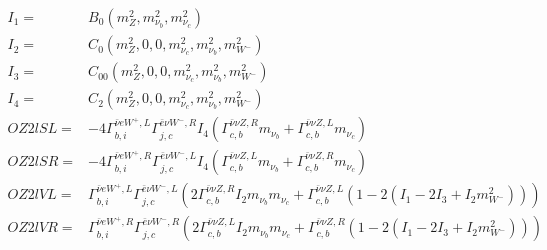 \documentclass[A4,landscape]{article}
\begin{document}
\begin{align} 
I_1= & B_0(m^2_{Z}, m^2_{\nu_{{b}}}, m^2_{\nu_{{c}}}) \\ 
I_2= & C_0(m^2_{Z}, 0, 0, m^2_{\nu_{{c}}}, m^2_{\nu_{{b}}}, m^2_{W^-}) \\ 
I_3= & C_{00}(m^2_{Z}, 0, 0, m^2_{\nu_{{c}}}, m^2_{\nu_{{b}}}, m^2_{W^-}) \\ 
I_4= & C_2(m^2_{Z}, 0, 0, m^2_{\nu_{{c}}}, m^2_{\nu_{{b}}}, m^2_{W^-}) \\ 
  OZ2lSL= & -4  \Gamma^{\bar{\nu}e W^+,L}_{b, i} \Gamma^{\bar{e}\nu W^- ,R}_{j, c} I_4 (\Gamma^{\bar{\nu}\nu Z ,R}_{c, b} m_{\nu_{{b}}} + \Gamma^{\bar{\nu}\nu Z ,L}_{c, b} m_{\nu_{{c}}}) \\ 
  OZ2lSR= & -4  \Gamma^{\bar{\nu}e W^+,R}_{b, i} \Gamma^{\bar{e}\nu W^- ,L}_{j, c} I_4 (\Gamma^{\bar{\nu}\nu Z ,L}_{c, b} m_{\nu_{{b}}} + \Gamma^{\bar{\nu}\nu Z ,R}_{c, b} m_{\nu_{{c}}}) \\ 
  OZ2lVL= &  \Gamma^{\bar{\nu}e W^+,L}_{b, i} \Gamma^{\bar{e}\nu W^- ,L}_{j, c} (2 \Gamma^{\bar{\nu}\nu Z ,R}_{c, b} I_2 m_{\nu_{{b}}} m_{\nu_{{c}}} + \Gamma^{\bar{\nu}\nu Z ,L}_{c, b} (1 - 2 (I_1 - 2 I_3 + I_2 m^2_{W^-}))) \\ 
  OZ2lVR= &  \Gamma^{\bar{\nu}e W^+,R}_{b, i} \Gamma^{\bar{e}\nu W^- ,R}_{j, c} (2 \Gamma^{\bar{\nu}\nu Z ,L}_{c, b} I_2 m_{\nu_{{b}}} m_{\nu_{{c}}} + \Gamma^{\bar{\nu}\nu Z ,R}_{c, b} (1 - 2 (I_1 - 2 I_3 + I_2 m^2_{W^-}))) \\ 
\end{align} 
\end{document}
